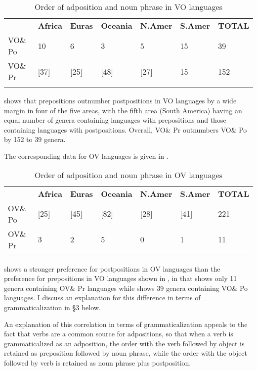 \documentclass[output=paper]{langsci/langscibook}
\begin{document}
\begin{table}
\begin{tabularx}{\textwidth}{XXXXXXX} 
\lsptoprule
& \bfseries Africa & \bfseries Euras & \bfseries Oceania & \bfseries N.Amer & \bfseries S.Amer & \bfseries TOTAL\\
VO\& Po & 10 & 6 & 3 & 5 & 15 & 39\\
VO\& Pr & [37] & [25] & [48] & [27] & 15 & 152\\
\lspbottomrule
\end{tabularx}
\caption{\label{tab:dryer:1}Order of adposition and noun phrase in VO languages}
\end{table}



 shows that prepositions outnumber postpositions in VO languages by a wide margin in four of the five areas, with the fifth area (South America) having an equal number of genera containing languages with prepositions and those containing languages with postpositions. Overall, VO\& Pr outnumbers VO\& Po by 152 to 39 genera.

The corresponding data for OV languages is given in .

\begin{table}
\begin{tabularx}{\textwidth}{XXXXXXX} 
\lsptoprule
& \bfseries Africa & \bfseries Euras & \bfseries Oceania & \bfseries N.Amer & \bfseries S.Amer & \bfseries TOTAL\\
OV\& Po & [25] & [45] & [82] & [28] & [41] & 221\\
OV\& Pr & 3 & 2 & 5 & 0 & 1 & 11\\
\lspbottomrule
\end{tabularx}
\caption{\label{tab:dryer:2}Order of adposition and noun phrase in OV languages}
\end{table}


 shows a stronger preference for postpositions in OV languages than the preference for prepositions in VO languages shown in , in that  shows only 11 genera containing OV\& Pr languages while  shows 39 genera containing VO\& Po languages. I discuss an explanation for this difference in terms of grammaticalization in §3 below.

An explanation of this correlation in terms of grammaticalization appeals to the fact that verbs are a common source for adpositions, so that when a verb is grammaticalized as an adposition, the order with the verb followed by object is retained as preposition followed by noun phrase, while the order with the object followed by verb is retained as noun phrase plus postposition.
\end{document}
